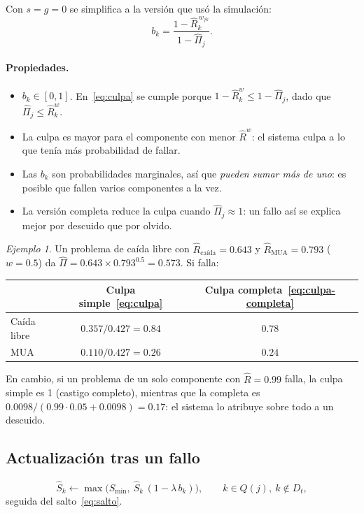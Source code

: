 \documentclass[11pt]{article}
\theoremstyle{definition}
\theoremstyle{remark}
\newtheorem{ejemplo}{Ejemplo}
\newcommand{\Rh}{\hat R}
\newcommand{\Sh}{\hat S}
\newcommand{\Pih}{\hat\Pi}
\newcommand{\Smin}{S_{\min}}
\begin{document}
Con $s=g=0$ se simplifica a la versión que usó la simulación:
\begin{equation}
b_k=\frac{1-\Rh_k^{\,w_{jk}}}{1-\Pih_j}.
\label{eq:culpa}
\end{equation}

\paragraph{Propiedades.}
\begin{itemize}
\item $b_k\in[0,1]$. En~\eqref{eq:culpa} se cumple porque $1-\Rh_k^{w}\le1-\Pih_j$, dado que $\Pih_j\le\Rh_k^{w}$.
\item La culpa es mayor para el componente con menor $\Rh^w$: el sistema culpa a lo que tenía más probabilidad de fallar.
\item Las $b_k$ son probabilidades marginales, así que \emph{pueden sumar más de uno}: es posible que fallen varios componentes a la vez.
\item La versión completa reduce la culpa cuando $\Pih_j\approx1$: un fallo así se explica mejor por descuido que por olvido.
\end{itemize}

\begin{ejemplo}
Un problema de caída libre con $\Rh_{\text{caída}}=0.643$ y $\Rh_{\text{MUA}}=0.793$ ($w=0.5$) da $\Pih=0.643\times0.793^{0.5}=0.573$. Si falla:
\begin{center}\small
\begin{tabular}{@{}lcc@{}}
\toprule
& Culpa simple~\eqref{eq:culpa} & Culpa completa~\eqref{eq:culpa-completa} \\
\midrule
Caída libre & $0.357/0.427=0.84$ & $0.78$ \\
MUA & $0.110/0.427=0.26$ & $0.24$ \\
\bottomrule
\end{tabular}
\end{center}
En cambio, si un problema de un solo componente con $\Rh=0.99$ falla, la culpa simple es 1 (castigo completo), mientras que la completa es $0.0098/(0.99\cdot0.05+0.0098)=0.17$: el sistema lo atribuye sobre todo a un descuido.
\end{ejemplo}

\subsection{Actualización tras un fallo}

\begin{equation}
\Sh_k\leftarrow\max\bigl(\Smin,\ \Sh_k\,(1-\lambda\,b_k)\bigr),\qquad k\in Q(j),\ k\notin D_t,
\label{eq:fallo}
\end{equation}
seguida del salto~\eqref{eq:salto}.
\end{document}
